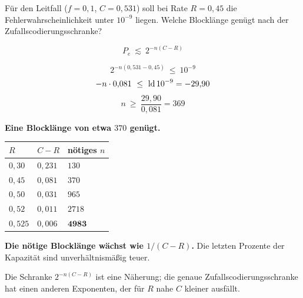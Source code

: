 \begin{aufgabe}
Für den Leitfall ($f=0{,}1$, $C = 0{,}531$) soll bei Rate $R = 0{,}45$ die Fehlerwahrscheinlichkeit unter $10^{-9}$ liegen. Welche Blocklänge genügt nach der Zufallscodierungsschranke?

\loesung
{}
\[ P_e \ \lesssim\ 2^{-n(C-R)} \]

\[ 2^{-n(0{,}531-0{,}45)} \ \le\ 10^{-9} \]
\[ -n\cdot0{,}081 \ \le\ \operatorname{ld} 10^{-9} = -29{,}90 \]
\[ n \ \ge\ \frac{29{,}90}{0{,}081} = 369 \]

\begin{center}
\begin{minipage}{0.9\textwidth}
\textbf{Eine Blocklänge von etwa $370$ genügt.}
\end{minipage}
\end{center}

\begin{center}
{\small
\renewcommand{\arraystretch}{1.48}
\begin{tabular}{@{}P{1.6cm}P{1.8cm}P{2.4cm}@{}}
\toprule
$R$ & $C-R$ & \textbf{nötiges $n$}\\
\midrule
$0{,}30$ & $0{,}231$ & $130$\\
$0{,}45$ & $0{,}081$ & $370$\\
$0{,}50$ & $0{,}031$ & $965$\\
$0{,}52$ & $0{,}011$ & $2718$\\
$0{,}525$ & $0{,}006$ & $\mathbf{4983}$\\
\bottomrule
\end{tabular}}
\end{center}

\begin{center}
\begin{minipage}{0.9\textwidth}
\textbf{Die nötige Blocklänge wächst wie $1/(C-R)$.} Die letzten Prozente der Kapazität sind unverhältnismäßig teuer.
\end{minipage}
\end{center}

Die Schranke $2^{-n(C-R)}$ ist eine Näherung; die genaue Zufallscodierungsschranke hat einen anderen Exponenten, der für $R$ nahe $C$ kleiner ausfällt.

\begin{center}
\begin{minipage}{0.88\textwidth}
\end{minipage}
\end{center}


\end{aufgabe}
